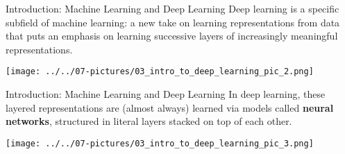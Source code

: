 \documentclass[11pt]{beamer}
\begin{document}
\begin{frame}{Introduction: Machine Learning and Deep Learning}
	Deep learning is a specific subfield of machine learning: a new take on learning representations from data that puts an emphasis on learning successive layers of increasingly meaningful representations.
	\begin{center}
	\texttt{[image: ../../07-pictures/03\_intro\_to\_deep\_learning\_pic\_2.png]}
	\end{center}
\end{frame}
\begin{frame}{Introduction: Machine Learning and Deep Learning}
	In deep learning, these layered representations are (almost always) learned via models called \textbf{neural networks}, structured in literal layers stacked on top of each other.
	\begin{center}
	\texttt{[image: ../../07-pictures/03\_intro\_to\_deep\_learning\_pic\_3.png]}
	\end{center}
\end{frame}
\end{document}
